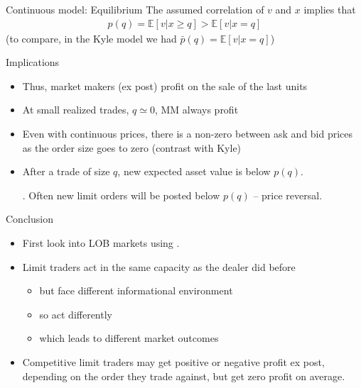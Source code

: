 \documentclass[english,10pt
,aspectratio=169
]{beamer}
\begin{document}
\begin{frame}{Continuous model: Equilibrium}
The assumed correlation of $v$ and $x$ implies that
\begin{align}
	p(q) = \mathbb{E}[v|x \geq q] > \mathbb{E}[v|x = q]
\end{align}
(to compare, in the Kyle model we had $\bar{p}(q) = \mathbb{E}[v|x = q]$)
\pause
\begin{block}{Implications}
	\begin{itemize}
		\item Thus, market makers (ex post) profit on the sale of the last units
		\item At small realized trades, $q \simeq 0$, MM always profit
		\item Even with continuous prices, there is a non-zero  between ask and bid prices as the order size goes to zero (contrast with Kyle)
		\item After a trade of size $q$, new expected asset value is below $p(q)$. \pause 
		
		. Often new limit orders will be posted below $p(q)$ -- price reversal.
	\end{itemize}
\end{block}
\end{frame}


\begin{frame}{Conclusion}
	\begin{itemize}
		\item First look into LOB markets using \cite{glosten_is_1994}.
		\item Limit traders act in the same capacity as the dealer did before
		\begin{itemize}
			\item but face different \alert{informational environment}
			\item so act differently
			\item which leads to different market outcomes
		\end{itemize}
		\item Competitive limit traders may get positive or negative profit ex post, depending on the order they trade against, but get zero profit on average.
	\end{itemize}
\end{frame}
\end{document}
